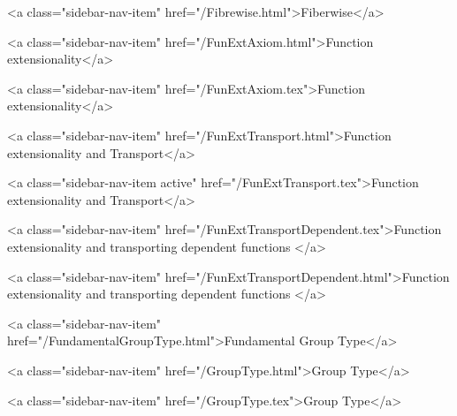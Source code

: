       
    
      
        
          <a class="sidebar-nav-item" href="/Fibrewise.html">Fiberwise</a>
        
      
    
      
        
          <a class="sidebar-nav-item" href="/FunExtAxiom.html">Function extensionality</a>
        
      
    
      
        
          <a class="sidebar-nav-item" href="/FunExtAxiom.tex">Function extensionality</a>
        
      
    
      
        
          <a class="sidebar-nav-item" href="/FunExtTransport.html">Function extensionality and Transport</a>
        
      
    
      
        
          <a class="sidebar-nav-item active" href="/FunExtTransport.tex">Function extensionality and Transport</a>
        
      
    
      
        
          <a class="sidebar-nav-item" href="/FunExtTransportDependent.tex">Function extensionality and transporting dependent functions </a>
        
      
    
      
        
          <a class="sidebar-nav-item" href="/FunExtTransportDependent.html">Function extensionality and transporting dependent functions </a>
        
      
    
      
        
          <a class="sidebar-nav-item" href="/FundamentalGroupType.html">Fundamental Group Type</a>
        
      
    
      
        
          <a class="sidebar-nav-item" href="/GroupType.html">Group Type</a>
        
      
    
      
        
          <a class="sidebar-nav-item" href="/GroupType.tex">Group Type</a>
        
      
    
